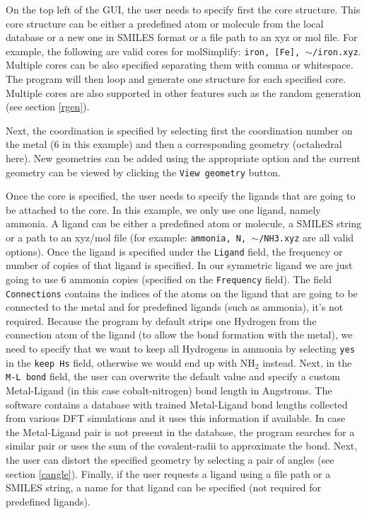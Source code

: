 \documentclass[a4paper,12pt]{assignment}
\begin{document}
On the top left of the GUI, the user needs to specify first the core structure. This core structure can be either a predefined atom or molecule from the local database or a new one in SMILES format or a file path to an xyz or mol file. For example, the following are valid cores for molSimplify: \texttt{iron, [Fe], $\sim$/iron.xyz}. Multiple cores can be also specified separating them with comma or whitespace. The program will then loop and generate one structure for each specified core. Multiple cores are also supported in other features such as the random generation (see section \ref{rgen}).

 Next, the coordination is specified by selecting first the coordination number on the metal (6 in this example) and then a corresponding geometry (octahedral here). New geometries can be added using the appropriate option and the current geometry can be viewed by clicking the \texttt{View geometry} button.

Once the core is specified, the user needs to specify the ligands that are going to be attached to the core. In this example, we only use one ligand, namely ammonia. A ligand can be either a predefined atom or molecule, a SMILES string or a path to an xyz/mol file (for example: \texttt{ammonia, N, $\sim$/NH3.xyz} are all valid options). Once the ligand is specified under the \texttt{Ligand} field, the frequency or number of copies of that ligand is specified. In our symmetric ligand we are just going to use 6 ammonia copies (specified on the \texttt{Frequency} field). The field \texttt{Connections} contains the indices of the atoms on the ligand that are going to be connected to the metal and for predefined ligands (such as ammonia), it's not required. Because the program by default strips one Hydrogen from the connection atom of the ligand (to allow the bond formation with the metal), we need to specify that we want to keep all Hydrogens in ammonia by selecting \texttt{yes} in the \texttt{keep Hs} field, otherwise we would end up with NH$_2$ instead. Next, in the \texttt{M-L bond} field, the user can overwrite the default value and specify a custom Metal-Ligand (in this case cobalt-nitrogen) bond length in Angstroms. The software contains a database with trained Metal-Ligand bond lengths collected from various DFT simulations and it uses this information if available. In case the Metal-Ligand pair is not present in the database, the program searches for a similar pair or uses the sum of the covalent-radii to approximate the bond. Next, the user can distort the specified geometry by selecting a pair of angles (see section \ref{cangle}). Finally, if the user requests a ligand using a file path or a SMILES string, a name for that ligand can be specified (not required for predefined ligands).
\end{document}
